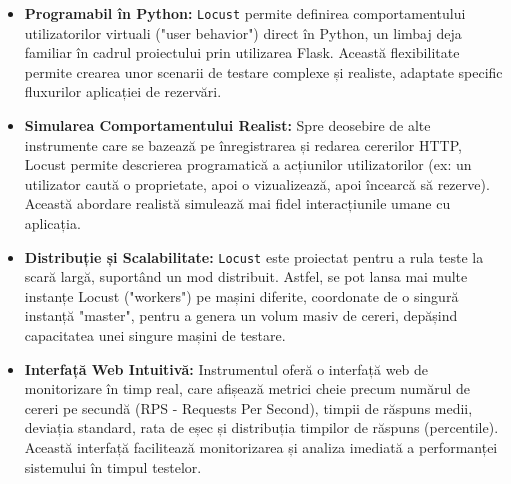 \documentclass[12pt, a4paper, oneside, romanian]{teza-upb}
\begin{document}
\begin{itemize}
	\item \textbf{Programabil în Python:} \texttt{Locust} permite definirea comportamentului utilizatorilor virtuali ("user behavior") direct în Python, un limbaj deja familiar în cadrul proiectului prin utilizarea Flask. Această flexibilitate permite crearea unor scenarii de testare complexe și realiste, adaptate specific fluxurilor aplicației de rezervări.
	\item \textbf{Simularea Comportamentului Realist:} Spre deosebire de alte instrumente care se bazează pe înregistrarea și redarea cererilor HTTP, Locust permite descrierea programatică a acțiunilor utilizatorilor (ex: un utilizator caută o proprietate, apoi o vizualizează, apoi încearcă să rezerve). Această abordare realistă simulează mai fidel interacțiunile umane cu aplicația.
	\item \textbf{Distribuție și Scalabilitate:} \texttt{Locust} este proiectat pentru a rula teste la scară largă, suportând un mod distribuit. Astfel, se pot lansa mai multe instanțe Locust ("workers") pe mașini diferite, coordonate de o singură instanță "master", pentru a genera un volum masiv de cereri, depășind capacitatea unei singure mașini de testare.
	
	\item \textbf{Interfață Web Intuitivă:} Instrumentul oferă o interfață web de monitorizare în timp real, care afișează metrici cheie precum numărul de cereri pe secundă (RPS - Requests Per Second), timpii de răspuns medii, deviația standard, rata de eșec și distribuția timpilor de răspuns (percentile). Această interfață facilitează monitorizarea și analiza imediată a performanței sistemului în timpul testelor.
\end{itemize}
\end{document}
